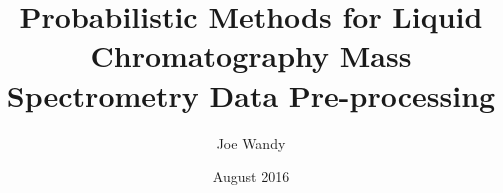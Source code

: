 \documentclass[twoside]{glasgowthesis}
\begin{document}
\pagestyle{empty}

\title{Probabilistic Methods for Liquid Chromatography Mass Spectrometry Data Pre-processing}
\author{Joe Wandy}
\date{August 2016}

\maketitle

\newpage

 

\newpage
 









\tableofcontents
\listoftables
\listoffigures

\newpage
\pagestyle{fancy}
\setcounter{page}{1}

\let\cleardoublepage\clearpage
\end{document}
